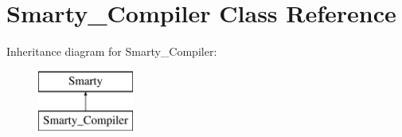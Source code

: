 \hypertarget{class_smarty___compiler}{}\section{Smarty\+\_\+\+Compiler Class Reference}
\label{class_smarty___compiler}
Inheritance diagram for Smarty\+\_\+\+Compiler\+:\begin{figure}[H]
\begin{center}
\leavevmode
\includegraphics[height=2.000000cm]{class_smarty___compiler}
\end{center}
\end{figure}
